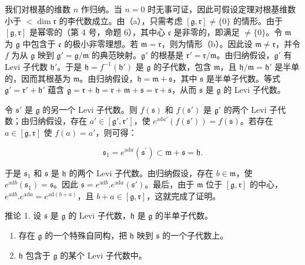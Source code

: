 我们对根基的维数 \(n\) 作归纳。当 \(n = 0\) 时无事可证，因此可假设定理对根基维数小于 \(<\dim \mathfrak{r}\) 的李代数成立。由（a），只需考虑 \([\mathfrak{g}, \mathfrak{r}] \neq \{0\}\) 的情形。由于 \([\mathfrak{g}, \mathfrak{r}]\) 是幂零的（第 4 号，命题 6），其中心 \(\mathfrak{c}\) 是非零的，即满足 \(\neq \{0\}\)。令 \(\mathfrak{m}\) 为 \(\mathfrak{g}\) 中包含于 \(\mathfrak{c}\) 的极小非零理想。若 \(\mathfrak{m} = \mathfrak{r}\)，则为情形（b）。因此设 \(\mathfrak{m} \neq \mathfrak{r}\)，并令 \(f\) 为从 \(\mathfrak{g}\) 映到 \(\mathfrak{g}' = \mathfrak{g}/\mathfrak{m}\) 的典范映射。\(\mathfrak{g}'\) 的根基是 \(\mathfrak{r}' = \mathfrak{r}/\mathfrak{m}\)。由归纳假设，\(\mathfrak{g}'\) 有 Levi 子代数 \(\mathfrak{h}'\)。于是 \(\mathfrak{h} = f^{-1}(\mathfrak{h}')\) 是 \(\mathfrak{g}\) 的子代数，包含 \(\mathfrak{m}\)，且 \(\mathfrak{h}/\mathfrak{m} = \mathfrak{h}'\) 是半单的，因而其根基为 \(\mathfrak{m}\)。由归纳假设，\(\mathfrak{h} = \mathfrak{m} + \mathfrak{s}\)，其中 \(\mathfrak{s}\) 是半单子代数。等式 \(\mathfrak{g}' = \mathfrak{r}' + \mathfrak{h}'\) 蕴含 \(\mathfrak{g} = \mathfrak{r} + \mathfrak{h} = \mathfrak{r} + \mathfrak{m} + \mathfrak{s} = \mathfrak{r} + \mathfrak{s}\)，从而 \(\mathfrak{s}\) 是 \(\mathfrak{g}\) 的 Levi 子代数。

令 \(\mathfrak{s}'\) 是 \(\mathfrak{g}\) 的另一个 Levi 子代数。则 \(f(\mathfrak{s})\) 和 \(f(\mathfrak{s}')\) 是 \(\mathfrak{g}'\) 的两个 Levi 子代数；由归纳假设，存在 \(a' \in [\mathfrak{g}', \mathfrak{r}']\)，使 \(e^{\mathrm{ad} a'}(f(\mathfrak{s}')) = f(\mathfrak{s})\)。若存在 \(a \in [\mathfrak{g}, \mathfrak{r}]\) 使 \(f(a) = a'\)，则可得：

\[
\mathfrak {s} _ {1} = e ^ {\mathrm{ad} a} \left(\mathfrak {s} ^ {\prime}\right) \subset \mathfrak {m} + \mathfrak {s} = \mathfrak {h}.
\]

于是 \(\mathfrak{s}_1\) 和 \(\mathfrak{s}\) 是 \(\mathfrak{h}\) 的两个 Levi 子代数。由归纳假设，存在 \(b\in \mathfrak{m}\)，使 \(e^{\mathrm{ad}b}(\mathfrak{s}_1) = \mathfrak{s}\)。因此 \(\mathfrak{s} = e^{\mathrm{ad}b}.e^{\mathrm{ad}a}(\mathfrak{s}')\)。最后，由于 \(\mathfrak{m}\) 位于 \([\mathfrak{g},\mathfrak{r}]\) 的中心，\(e^{\mathrm{ad}b}.e^{\mathrm{ad}a} = e^{\mathrm{ad}(b + a)}\)，且 \(b + a\in [\mathfrak{g},\mathfrak{r}]\)，这就完成了证明。

推论 1. 设 \(\mathfrak{s}\) 是 \(\mathfrak{g}\) 的 Levi 子代数，\(\mathfrak{h}\) 是 \(\mathfrak{g}\) 的半单子代数。

\begin{enumerate}
\def\labelenumi{(\alph{enumi})}
\item
  存在 \(\mathfrak{g}\) 的一个特殊自同构，把 \(\mathfrak{h}\) 映到 \(\mathfrak{s}\) 的一个子代数上。
\item
  \(\mathfrak{h}\) 包含于 \(\mathfrak{g}\) 的某个 Levi 子代数中。
\end{enumerate}

